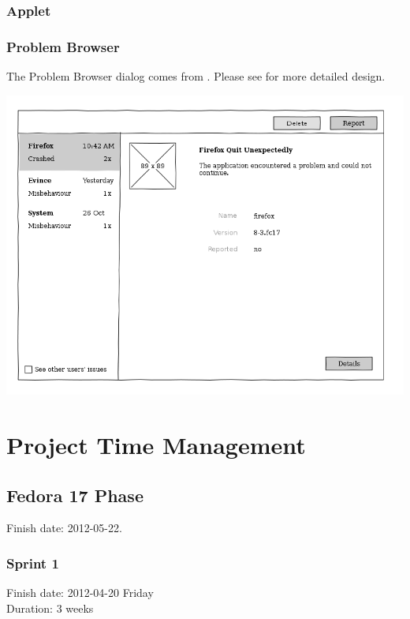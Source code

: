 \documentclass{article}
\begin{document}
\subsubsection{Applet}

\cleardoublepage
\subsubsection{Problem Browser}
The Problem Browser dialog comes from \cite{JonOops}. Please see
\cite{JonOops} for more detailed design.

\begin{center}
\includegraphics[width=\textwidth]{client-ui-issue-browser.png}
\end{center}

\section{Project Time Management}

\subsection{Fedora 17 Phase}
Finish date: 2012-05-22.

\subsubsection{Sprint 1}
Finish date: 2012-04-20 Friday \\
Duration: 3 weeks
\end{document}
